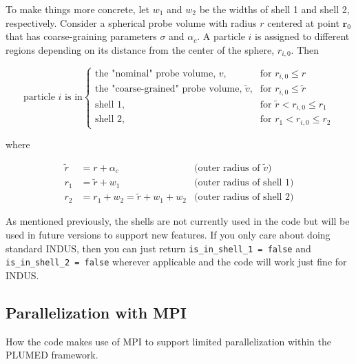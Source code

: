 \documentclass[11pt,notitlepage]{article}
\begin{document}

To make things more concrete, let $w_1$ and $w_2$ be the widths of shell 1 and shell 2, respectively. Consider a spherical probe volume with radius $r$ centered at point $\mathbf{r}_0$ that has coarse-graining parameters $\sigma$ and $\alpha_c$. A particle $i$ is assigned to different regions depending on its distance from the center of the sphere, $r_{i,0}$. Then

\begin{equation}
	\text{particle $i$ is in}
	\begin{cases}
		\text{the "nominal" probe volume, $v$,}
			& \text{for } r_{i,0} \leq r \\
		\text{the "coarse-grained" probe volume, $\tilde{v}$,}
			& \text{for } r_{i,0} \leq \tilde{r} \\
		\text{shell 1,}
			& \text{for } \tilde{r} < r_{i,0} \leq r_1 \\
		\text{shell 2,}
			& \text{for } r_1 < r_{i,0} \leq r_2
	\end{cases}
\end{equation}

\noindent where

\begin{align}
	\tilde{r} &= r + \alpha_c                       & \text{(outer radius of $\tilde{v}$)} \\
	r_1       &= \tilde{r} + w_1                    & \text{(outer radius of shell 1)} \\
	r_2       &= r_1 + w_2 = \tilde{r} + w_1 + w_2  & \text{(outer radius of shell 2)}
\end{align}


As mentioned previously, the shells are not currently used in the code but will be used in future versions to support new features. If you only care about doing standard INDUS, then you can just return \texttt{is\_in\_shell\_1 = false} and \texttt{is\_in\_shell\_2 = false} wherever applicable and the code will work just fine for INDUS.


\subsection{Parallelization with MPI}

How the code makes use of MPI to support limited parallelization within the PLUMED framework.








\end{document}
